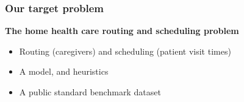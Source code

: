 \begin{frame}
   \frametitle{Our target problem}

   \textbf{The home health care routing and scheduling problem}
   \begin{itemize}
      \item Routing (caregivers) and scheduling (patient visit times)
      \item A model, and heuristics
      \item A public standard benchmark dataset
   \end{itemize}



\end{frame}



%
%
%
%
%

